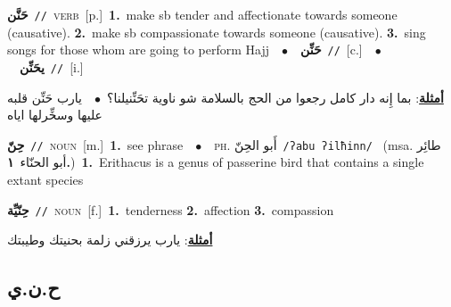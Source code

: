\documentclass[10pt,a4paper,twoside]{article} %
\begin{document}
\begin{multicols}{2}
{\setlength\topsep{0pt}\textbf{\foreignlanguage{arabic}{حَنَّن}}\ {\color{gray}\texttt{//}\color{black}}\ \textsc{verb}\ [p.]\ \textbf{1.}~make sb tender and affectionate towards someone (causative).  \textbf{2.}~make sb compassionate towards someone (causative).  \textbf{3.}~sing songs for those whom are going to perform Hajj\ \ $\bullet$\ \ \setlength\topsep{0pt}\textbf{\foreignlanguage{arabic}{حَنِّن}}\ {\color{gray}\texttt{//}\color{black}}\ [c.]\ \ $\bullet$\ \ \setlength\topsep{0pt}\textbf{\foreignlanguage{arabic}{يحَنِّن}}\ {\color{gray}\texttt{//}\color{black}}\ [i.]\  \begin{flushright}\color{gray}\foreignlanguage{arabic}{\textbf{\underline{\foreignlanguage{arabic}{أمثلة}}}: بما إِنه دار كامل رجعوا من الحج بالسلامة شو ناوية تحَنِّنيلنا؟\ $\bullet$\ \  يارب حَنِّن قلبه عليها وسخِّرلها اياه}\end{flushright}\color{black}} \vspace{2mm}

{\setlength\topsep{0pt}\textbf{\foreignlanguage{arabic}{حِنّ}}\ {\color{gray}\texttt{//}\color{black}}\ \textsc{noun}\ [m.]\ \textbf{1.}~see phrase\ \ $\bullet$\ \ \textsc{ph.} \color{gray} \foreignlanguage{arabic}{أَبو الحِنّ}\color{black}\ {\color{gray}\texttt{/{\sffamily ʔabu ʔilħinn}/}\color{black}}\ \color{gray} (msa. \foreignlanguage{arabic}{طائِر أبو الحنّاء}~\foreignlanguage{arabic}{\textbf{١.}})\color{black}\ \textbf{1.}~Erithacus is a genus of passerine bird that contains a single extant species\ } \vspace{2mm}

{\setlength\topsep{0pt}\textbf{\foreignlanguage{arabic}{حِنّيِّة}}\ {\color{gray}\texttt{//}\color{black}}\ \textsc{noun}\ [f.]\ \textbf{1.}~tenderness  \textbf{2.}~affection  \textbf{3.}~compassion\  \begin{flushright}\color{gray}\foreignlanguage{arabic}{\textbf{\underline{\foreignlanguage{arabic}{أمثلة}}}: يارب يرزقني زلمة بحنيتك وطيبتك}\end{flushright}\color{black}} \vspace{2mm}

\vspace{-3mm}
\subsection*{\color{blue}\foreignlanguage{arabic}{ح.ن.ي}\color{blue}{}} 


\end{multicols}
\end{document}
